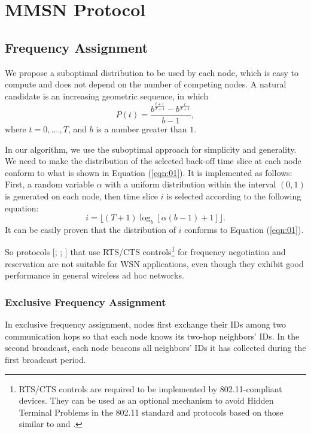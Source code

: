 \documentclass[prodmode,acmtecs]{acmsmall}
\begin{document}
\section{MMSN Protocol}

\subsection{Frequency Assignment}

We propose a suboptimal distribution to be used by each node, which is
easy to compute and does not depend on the number of competing
nodes. A natural candidate is an increasing geometric sequence, in
which
\begin{equation}
\label{eqn:01}
P(t)=\frac{b^{\frac{t+1}{T+1}}-b^{\frac{t}{T+1}}}{b-1},
\end{equation}
where $t=0,{\ldots}\,,T$, and $b$ is a number greater than $1$.

In our algorithm, we use the suboptimal approach for simplicity and
generality. We need to make the distribution of the selected back-off
time slice at each node conform to what is shown in Equation
(\ref{eqn:01}). It is implemented as follows: First, a random
variable $\alpha$ with a uniform distribution within the interval
$(0, 1)$ is generated on each node, then time slice $i$ is selected
according to the following equation:
\[
i=\lfloor(T+1)\log_b[\alpha(b-1)+1]\rfloor.
\]
It can be easily proven that the distribution of $i$ conforms to Equation
(\ref{eqn:01}).

So protocols [;
; ] that use RTS/CTS
controls\footnote{RTS/CTS controls are required to be implemented by
802.11-compliant devices. They can be used as an optional mechanism
to avoid Hidden Terminal Problems in the 802.11 standard and
protocols based on those similar to  and
.} for frequency negotiation and reservation are not
suitable for WSN applications, even though they exhibit good
performance in general wireless ad hoc
networks.

\subsubsection{Exclusive Frequency Assignment}

In exclusive frequency assignment, nodes first exchange their IDs
among two communication hops so that each node knows its two-hop
neighbors' IDs. In the second broadcast, each node beacons all
neighbors' IDs it has collected during the first broadcast period.
\end{document}
